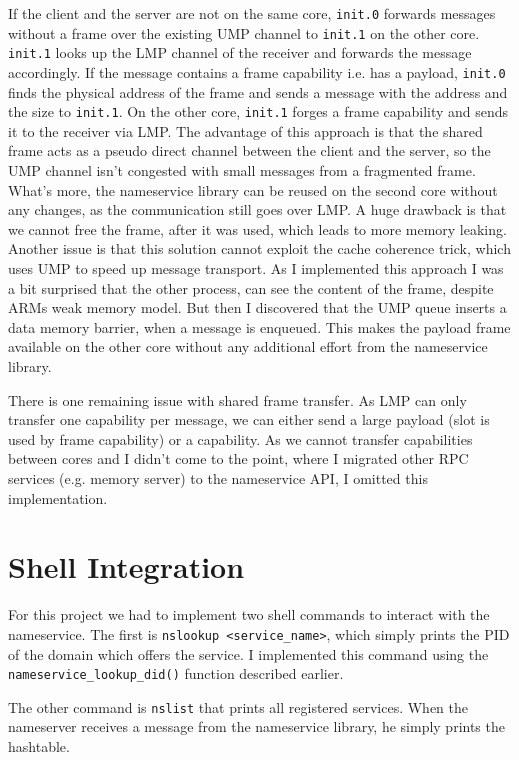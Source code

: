 If the client and the server are not on the same core, \verb|init.0| forwards messages without a frame over the existing UMP channel to 
\verb|init.1| on the other core. \verb|init.1| looks up the LMP channel of the receiver and forwards the message accordingly. If the 
message contains a frame capability i.e. has a payload, \verb|init.0| finds the physical address of the frame and sends a message 
with the address and the size to \verb|init.1|. On the other core, \verb|init.1| forges a frame capability and sends it to the receiver
via LMP. The advantage of this approach is that the shared frame acts as a pseudo direct channel between the client and the server, so
the UMP channel isn't congested with small messages from a fragmented frame. What's more, the nameservice library can be reused on the
second core without any changes, as the communication still goes over LMP. A huge drawback is that we cannot free the frame, after it
was used, which leads to more memory leaking. Another issue is that this solution cannot exploit the cache coherence trick, which uses UMP
to speed up message transport. As I implemented this approach I was a bit surprised that the other process, can see the content of the frame,
despite ARMs weak memory model. But then I discovered that the UMP queue inserts a data memory barrier, when a message is enqueued. This
makes the payload frame available on the other core without any additional effort from the nameservice library.

There is one remaining issue with shared frame transfer. As LMP can only transfer one capability per message, we can either send a large
payload (slot is used by frame capability) or a capability. As we cannot transfer capabilities between cores and I didn't come to the point,
where I migrated other RPC services (e.g. memory server) to the nameservice API, I omitted this implementation.

\section{Shell Integration}

For this project we had to implement two shell commands to interact with the nameservice. The first is \verb|nslookup <service_name>|, which
simply prints the PID of the domain which offers the service. I implemented this command using the \verb|nameservice_lookup_did()| function
described earlier.

The other command is \verb|nslist| that prints all registered services. When the nameserver receives a message from the nameservice library,
he simply prints the hashtable.

